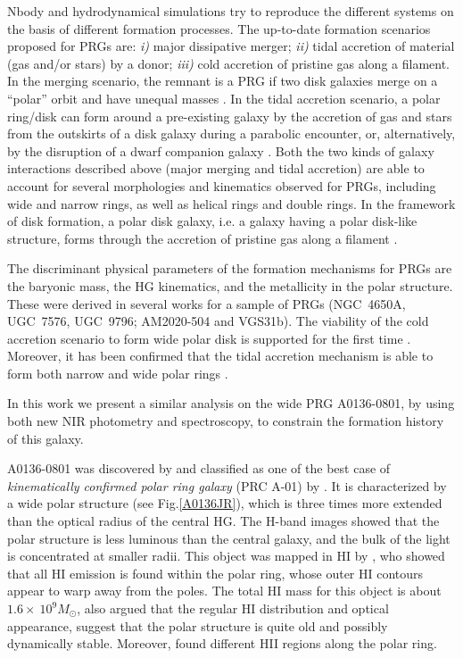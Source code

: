 \documentclass[useAMS,usenatbib]{mn2e}
\begin{document}
Nbody and hydrodynamical simulations try to reproduce the different
systems on the basis of different formation processes.  The up-to-date
formation scenarios proposed for PRGs are: {\it i)} major dissipative
merger; {\it ii)} tidal accretion of material (gas and/or stars) by a
donor; {\it iii)} cold accretion of pristine gas along a filament.  In
the merging scenario, the remnant is a PRG if two disk galaxies merge
on a ``polar'' orbit and have unequal masses \citep{Bou05}. In the
tidal accretion scenario, a polar ring/disk can form around a
pre-existing galaxy by the accretion of gas and stars from the
outskirts of a disk galaxy during a parabolic encounter, or,
alternatively, by the disruption of a dwarf companion galaxy
\citep{Res97, Bou03, Han09}.  Both the two kinds of galaxy
interactions described above (major merging and tidal accretion) are
able to account for several morphologies and kinematics observed for
PRGs, including wide and narrow rings, as well as helical rings and
double rings.  In the framework of disk formation, a polar disk
galaxy, i.e. a galaxy having a polar disk-like structure, forms
through the accretion of pristine gas along a filament \citep{Mac06,
  Bro08}.

The discriminant physical parameters of the formation mechanisms for
PRGs are the baryonic mass, the HG kinematics, and the metallicity in
the polar structure.
%
These were derived in several works for a sample of PRGs (NGC~4650A,
UGC~7576, UGC~9796; AM2020-504 and VGS31b). The viability of the cold
accretion scenario to form wide polar disk is supported for the first
time \citep{Spav10}. Moreover, it has been confirmed that the tidal
accretion mechanism is able to form both narrow and wide polar rings
\citep{Spav11, Frei12, Spav13}.
 
In this work we present a similar analysis on the wide PRG A0136-0801,
by using both new NIR photometry and spectroscopy, to constrain the
formation history of this galaxy. 

A0136-0801 was discovered by \citet{Sch83} and classified as one of
the best case of \emph{kinematically confirmed polar ring galaxy} (PRC
A-01) by \citet{Whi90}. It is characterized by a wide polar structure
(see Fig.\ref{A0136JR}), which is three times more extended than the
optical radius of the central HG. The H-band images \citep{Iod02b}
showed that the polar structure is less luminous than the central
galaxy, and the bulk of the light is concentrated at smaller
radii. This object was mapped in HI by \citet{Cox04}, who showed that
all HI emission is found within the polar ring, whose outer HI
contours appear to warp away from the poles. The total HI mass for
this object is about $1.6 \times\ 10^{9} M_{\odot}$,
\citet{vanDriel00} also argued that the regular HI distribution and
optical appearance, suggest that the polar structure is quite old and
possibly dynamically stable. Moreover, \citet{Sackett95} found
different HII regions along the polar ring.
\end{document}
